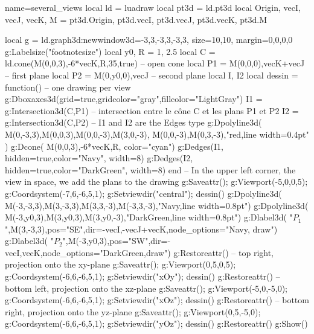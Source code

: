 \begin{luadraw}{name=several_views}
local ld = luadraw
local pt3d = ld.pt3d
local Origin, vecI, vecJ, vecK, M = pt3d.Origin, pt3d.vecI, pt3d.vecJ, pt3d.vecK, pt3d.M

local g = ld.graph3d:new{window3d={-3,3,-3,3,-3,3}, size={10,10}, margin={0,0,0,0}}
g:Labelsize("footnotesize")
local y0, R = 1, 2.5
local C = ld.cone(M(0,0,3),-6*vecK,R,35,true) -- open cone
local P1 = {M(0,0,0),vecK+vecJ} -- first plane
local P2 = {M(0,y0,0),vecJ} -- second plane
local I, I2
local dessin = function() -- one drawing per view
    g:Dboxaxes3d({grid=true,gridcolor="gray",fillcolor="LightGray"})
    I1 = g:Intersection3d(C,P1) -- intersection entre le cône C et les plans P1 et P2
    I2 = g:Intersection3d(C,P2) -- I1 and I2 are the Edges type
    g:Dpolyline3d( {{M(0,-3,3),M(0,0,3),M(0,0,-3),M(3,0,-3)}, {M(0,0,-3),M(0,3,-3)}},"red,line width=0.4pt" )
    g:Dcone( M(0,0,3),-6*vecK,R, {color="cyan"})
    g:Dedges(I1, {hidden=true,color="Navy", width=8})
    g:Dedges(I2, {hidden=true,color="DarkGreen", width=8})
end
-- In the upper left corner, the view in space, we add the plans to the drawing
g:Saveattr(); g:Viewport(-5,0,0,5); g:Coordsystem(-7,6,-6,5,1); g:Setviewdir("central"); dessin()
g:Dpolyline3d( {M(-3,-3,3),M(3,-3,3),M(3,3,-3),M(-3,3,-3)},"Navy,line width=0.8pt")
g:Dpolyline3d( {M(-3,y0,3),M(3,y0,3),M(3,y0,-3)},"DarkGreen,line width=0.8pt")
g:Dlabel3d( "$P_1$",M(3,-3,3),{pos="SE",dir={-vecI,-vecJ+vecK},node_options="Navy, draw"})
g:Dlabel3d( "$P_2$",M(-3,y0,3),{pos="SW",dir={-vecI,vecK},node_options="DarkGreen,draw"})
g:Restoreattr()
-- top right, projection onto the xy-plane
g:Saveattr(); g:Viewport(0,5,0,5); g:Coordsystem(-6,6,-6,5,1); g:Setviewdir("xOy"); dessin()
g:Restoreattr()
-- bottom left, projection onto the xz-plane
g:Saveattr(); g:Viewport(-5,0,-5,0); g:Coordsystem(-6,6,-6,5,1); g:Setviewdir("xOz"); dessin()
g:Restoreattr()
-- bottom right, projection onto the yz-plane
g:Saveattr(); g:Viewport(0,5,-5,0); g:Coordsystem(-6,6,-6,5,1); g:Setviewdir("yOz"); dessin()
g:Restoreattr()
g:Show()
\end{luadraw}

